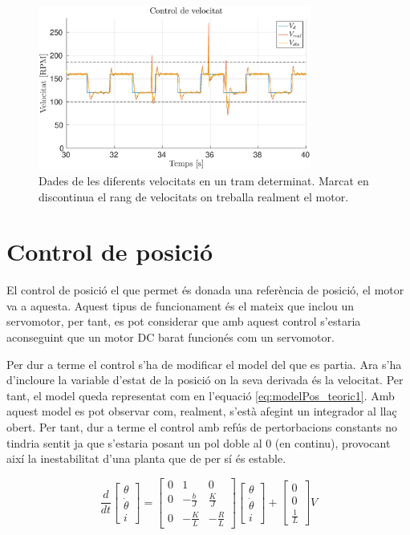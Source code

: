 \documentclass[12pt,a4paper,final,twoside,openright]{report}
\begin{document}
\begin{figure}[h]
\centering
\includegraphics[width=0.8\textwidth]{Imatges/controlVelocitatGraph.eps}
\caption{Dades de les diferents velocitats en un tram determinat. Marcat en discontinua el rang de velocitats on treballa realment el motor.\label{fig:controlVelocitatGraph}}
\end{figure}

\section{Control de posició}

El control de posició el que permet és donada una referència de posició, el motor va a aquesta. Aquest tipus de funcionament és el mateix que inclou un servomotor, per tant, es pot considerar que amb aquest control s'estaria aconseguint que un motor DC barat funcionés com un servomotor.

Per dur a terme el control s'ha de modificar el model del que es partia. Ara s'ha d'incloure la variable d'estat de la posició on la seva derivada és la velocitat. Per tant, el model queda representat com en l'equació \eqref{eq:modelPos_teoric1}. Amb aquest model es pot observar com, realment, s'està afegint un integrador al llaç obert. Per tant, dur a terme el control amb refús de pertorbacions constants no tindria sentit ja que s'estaria posant un pol doble al $0$ (en continu), provocant així la inestabilitat d'una planta que de per sí és estable.

\begin{equation}
\frac{d}{dt}\begin{bmatrix}
\theta\\
\dot{\theta}\\
i
\end{bmatrix} = \begin{bmatrix}
0 & 1 & 0\\
0 & -\frac{b}{J} & \frac{K}{J}\\
0 & -\frac{K}{L} & -\frac{R}{L}
\end{bmatrix}
\begin{bmatrix}
\theta\\
\dot{\theta}\\
i
\end{bmatrix} + \begin{bmatrix}
0\\
0\\
\frac{1}{L}
\end{bmatrix} V \label{eq:modelPos_teoric1}
\end{equation}
\end{document}
